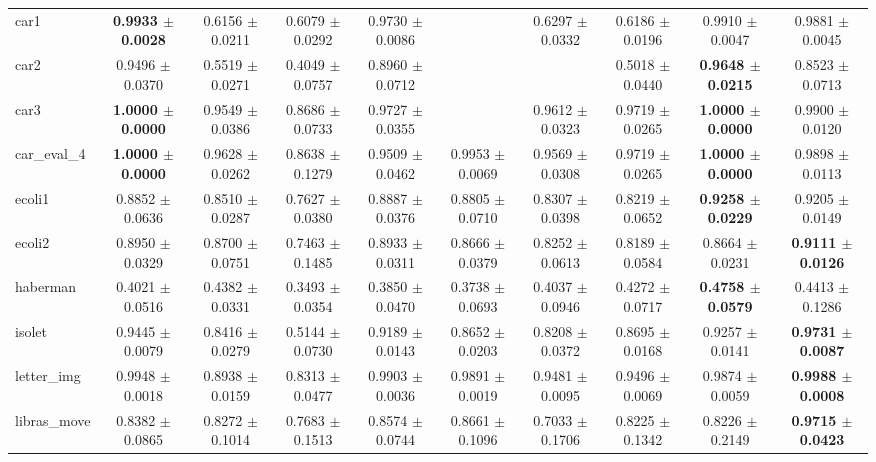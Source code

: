 \begin{table*}[htbp]
{\begin{tabular}{lccccccccc}
            car1 & \cellcolor{graybg}\textbf{0.9933 $\pm$ 0.0028} & 0.6156 $\pm$ 0.0211 & 0.6079 $\pm$ 0.0292 & 0.9730 $\pm$ 0.0086 &  & 0.6297 $\pm$ 0.0332 & 0.6186 $\pm$ 0.0196 & 0.9910 $\pm$ 0.0047 & 0.9881 $\pm$ 0.0045 \\ 
            car2 & 0.9496 $\pm$ 0.0370 & 0.5519 $\pm$ 0.0271 & 0.4049 $\pm$ 0.0757 & 0.8960 $\pm$ 0.0712 &  &  & 0.5018 $\pm$ 0.0440 & \cellcolor{graybg}\textbf{0.9648 $\pm$ 0.0215} & 0.8523 $\pm$ 0.0713 \\ 
            car3 & \cellcolor{graybg}\textbf{1.0000 $\pm$ 0.0000} & 0.9549 $\pm$ 0.0386 & 0.8686 $\pm$ 0.0733 & 0.9727 $\pm$ 0.0355 &  & 0.9612 $\pm$ 0.0323 & 0.9719 $\pm$ 0.0265 & \cellcolor{graybg}\textbf{1.0000 $\pm$ 0.0000} & 0.9900 $\pm$ 0.0120 \\ 
            car\_eval\_4 & \cellcolor{graybg}\textbf{1.0000 $\pm$ 0.0000} & 0.9628 $\pm$ 0.0262 & 0.8638 $\pm$ 0.1279 & 0.9509 $\pm$ 0.0462 & 0.9953 $\pm$ 0.0069 & 0.9569 $\pm$ 0.0308 & 0.9719 $\pm$ 0.0265 & \cellcolor{graybg}\textbf{1.0000 $\pm$ 0.0000} & 0.9898 $\pm$ 0.0113 \\ 
            ecoli1 & 0.8852 $\pm$ 0.0636 & 0.8510 $\pm$ 0.0287 & 0.7627 $\pm$ 0.0380 & 0.8887 $\pm$ 0.0376 & 0.8805 $\pm$ 0.0710 & 0.8307 $\pm$ 0.0398 & 0.8219 $\pm$ 0.0652 & \cellcolor{graybg}\textbf{0.9258 $\pm$ 0.0229} & 0.9205 $\pm$ 0.0149 \\ 
            ecoli2 & 0.8950 $\pm$ 0.0329 & 0.8700 $\pm$ 0.0751 & 0.7463 $\pm$ 0.1485 & 0.8933 $\pm$ 0.0311 & 0.8666 $\pm$ 0.0379 & 0.8252 $\pm$ 0.0613 & 0.8189 $\pm$ 0.0584 & 0.8664 $\pm$ 0.0231 & \cellcolor{graybg}\textbf{0.9111 $\pm$ 0.0126} \\ 
            haberman & 0.4021 $\pm$ 0.0516 & 0.4382 $\pm$ 0.0331 & 0.3493 $\pm$ 0.0354 & 0.3850 $\pm$ 0.0470 & 0.3738 $\pm$ 0.0693 & 0.4037 $\pm$ 0.0946 & 0.4272 $\pm$ 0.0717 & \cellcolor{graybg}\textbf{0.4758 $\pm$ 0.0579} & 0.4413 $\pm$ 0.1286 \\ 
            isolet & 0.9445 $\pm$ 0.0079 & 0.8416 $\pm$ 0.0279 & 0.5144 $\pm$ 0.0730 & 0.9189 $\pm$ 0.0143 & 0.8652 $\pm$ 0.0203 & 0.8208 $\pm$ 0.0372 & 0.8695 $\pm$ 0.0168 & 0.9257 $\pm$ 0.0141 & \cellcolor{graybg}\textbf{0.9731 $\pm$ 0.0087} \\ 
            letter\_img & 0.9948 $\pm$ 0.0018 & 0.8938 $\pm$ 0.0159 & 0.8313 $\pm$ 0.0477 & 0.9903 $\pm$ 0.0036 & 0.9891 $\pm$ 0.0019 & 0.9481 $\pm$ 0.0095 & 0.9496 $\pm$ 0.0069 & 0.9874 $\pm$ 0.0059 & \cellcolor{graybg}\textbf{0.9988 $\pm$ 0.0008} \\ 
            libras\_move & 0.8382 $\pm$ 0.0865 & 0.8272 $\pm$ 0.1014 & 0.7683 $\pm$ 0.1513 & 0.8574 $\pm$ 0.0744 & 0.8661 $\pm$ 0.1096 & 0.7033 $\pm$ 0.1706 & 0.8225 $\pm$ 0.1342 & 0.8226 $\pm$ 0.2149 & \cellcolor{graybg}\textbf{0.9715 $\pm$ 0.0423} \\ 

\end{tabular}}
\end{table*}
